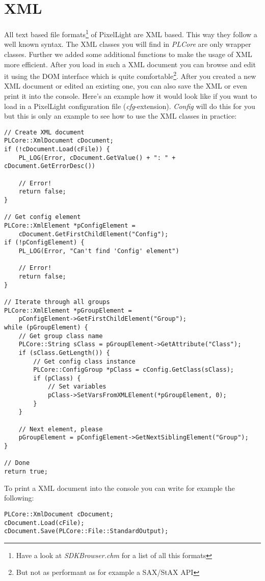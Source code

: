 \section{\ac{XML}}
All text based file formats\footnote{Have a look at \emph{SDKBrowser.chm} for a list of all this formats} of PixelLight are \ac{XML} based. This way they follow a well known syntax. The \ac{XML} classes you will find in \emph{PLCore} are only wrapper classes. Further we added some additional functions to make the usage of \ac{XML} more efficient. After you load in such a \ac{XML} document you can browse and edit it using the \ac{DOM} interface which is quite comfortable\footnote{But not as performant as for example a \ac{SAX}/\ac{StAX} \ac{API}}. After you created a new \ac{XML} document or edited an existing one, you can also save the \ac{XML} or even print it into the console. Here's an example how it would look like if you want to load in a PixelLight configuration file (\emph{cfg}-extension). \emph{Config} will do this for you but this is only an example to see how to use the \ac{XML} classes in practice:

\begin{lstlisting}[caption=\ac{XML} \ac{DOM} usage example]
// Create XML document
PLCore::XmlDocument cDocument;
if (!cDocument.Load(cFile)) {
	PL_LOG(Error, cDocument.GetValue() + ": " + cDocument.GetErrorDesc())

	// Error!
	return false;
}

// Get config element
PLCore::XmlElement *pConfigElement =
	cDocument.GetFirstChildElement("Config");
if (!pConfigElement) {
	PL_LOG(Error, "Can't find 'Config' element")

	// Error!
	return false;
}

// Iterate through all groups
PLCore::XmlElement *pGroupElement =
	pConfigElement->GetFirstChildElement("Group");
while (pGroupElement) {
	// Get group class name
	PLCore::String sClass = pGroupElement->GetAttribute("Class");
	if (sClass.GetLength()) {
		// Get config class instance
		PLCore::ConfigGroup *pClass = cConfig.GetClass(sClass);
		if (pClass) {
			// Set variables
			pClass->SetVarsFromXMLElement(*pGroupElement, 0);
		}
	}

	// Next element, please
	pGroupElement = pConfigElement->GetNextSiblingElement("Group");
}

// Done
return true;
\end{lstlisting}

To print a \ac{XML} document into the console you can write for example the following:

\begin{lstlisting}[caption=Print \ac{XML} document into the console]
PLCore::XmlDocument cDocument;
cDocument.Load(cFile);
cDocument.Save(PLCore::File::StandardOutput);
\end{lstlisting}
